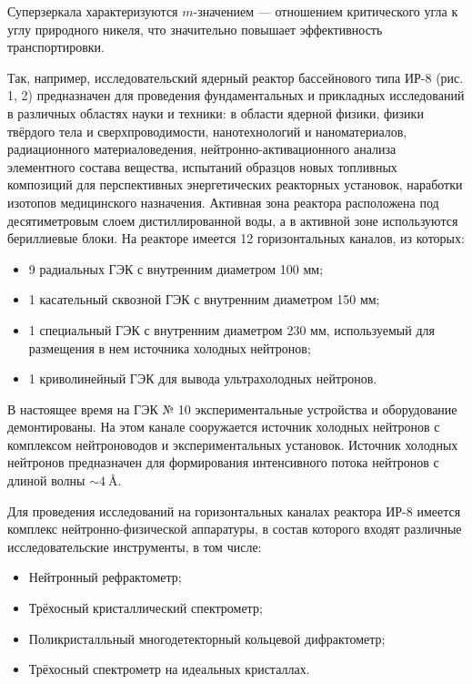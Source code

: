 \documentclass[a4paper]{article}
\begin{document}
Суперзеркала характеризуются $m$-значением --- отношением критического угла к углу природного никеля, что значительно повышает эффективность транспортировки.

\bigskip

Так, например, исследовательский ядерный реактор бассейнового типа ИР-8 (рис. 1, 2) предназначен для проведения фундаментальных и прикладных исследований в различных областях науки и техники: в области ядерной физики, физики твёрдого тела и сверхпроводимости, нанотехнологий и наноматериалов, радиационного материаловедения, нейтронно-активационного анализа элементного состава вещества, испытаний образцов новых топливных композиций для перспективных энергетических реакторных установок, наработки изотопов медицинского назначения. Активная зона реактора расположена под десятиметровым слоем дистиллированной воды, а в активной зоне используются бериллиевые блоки. На реакторе имеется 12 горизонтальных каналов, из которых:

\begin{itemize}
    \item 9 радиальных ГЭК с внутренним диаметром 100 мм;
    
    \item 1 касательный сквозной ГЭК с внутренним диаметром 150 мм;
    
    \item 1 специальный ГЭК с внутренним диаметром 230 мм, используемый для размещения в нем источника холодных нейтронов;
    
    \item 1 криволинейный ГЭК для вывода ультрахолодных нейтронов.
\end{itemize}

В настоящее время на ГЭК № 10 экспериментальные устройства и оборудование демонтированы. На этом канале сооружается источник холодных нейтронов с комплексом нейтроноводов и экспериментальных установок. Источник холодных нейтронов предназначен для формирования интенсивного потока нейтронов с длиной волны \(\sim\SI{4}{\angstrom}\).

Для проведения исследований на горизонтальных каналах реактора ИР-8 имеется комплекс нейтронно-физической аппаратуры, в состав которого входят различные исследовательские инструменты, в том числе:

\begin{itemize}
    \item Нейтронный рефрактометр;
    
    \item Трёхосный кристаллический спектрометр;
    
    \item Поликристалльный многодетекторный кольцевой дифрактометр;
    
    \item Трёхосный спектрометр на идеальных кристаллах.
\end{itemize}
\end{document}
